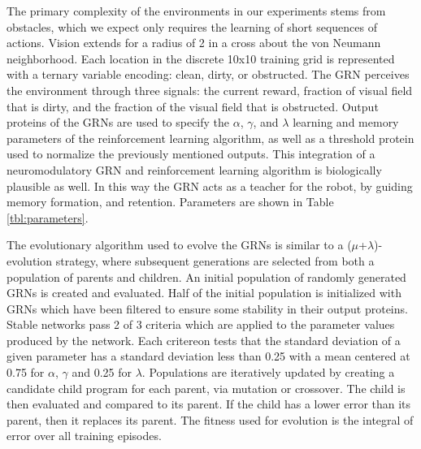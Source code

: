 \documentclass[conference]{IEEEtran}
\begin{document}
The primary complexity of the environments in our experiments stems from
obstacles, which we expect only requires the learning of short sequences of
actions. Vision extends for a radius of 2 in a cross about the von Neumann
neighborhood. Each location in the discrete 10x10 training grid is represented
with a ternary variable encoding: clean, dirty, or obstructed. The GRN perceives
the environment through three signals: the current reward, fraction of visual field
that is dirty, and the fraction of the visual field that is obstructed. Output
proteins of the GRNs are used to specify the $\alpha$, $\gamma$, and $\lambda$
learning and memory parameters of the reinforcement learning algorithm, as well as
a threshold protein used to normalize the previously mentioned outputs. This
integration of a neuromodulatory GRN and reinforcement learning algorithm is
biologically plausible as well. In this way the GRN acts as a teacher for the
robot, by guiding memory formation, and retention. Parameters are
shown in Table \ref{tbl:parameters}.

The evolutionary algorithm used to evolve the GRNs is similar to a
($\mu$+$\lambda$)-evolution strategy, where subsequent generations are selected
from both a population of parents and children. An initial population of
randomly generated GRNs is created and evaluated. Half of the initial population
is initialized with GRNs which have been filtered to ensure some stability in
their output proteins.
Stable networks pass 2 of 3 criteria which are applied to the parameter values
produced by the network. Each critereon tests that the standard deviation of a
given parameter has a standard deviation less than 0.25 with a mean centered at
0.75 for $\alpha$, $\gamma$ and 0.25 for $\lambda$.
Populations are iteratively updated by creating a candidate child program for
each parent, via mutation or crossover. The child is then evaluated and compared
to its parent. If the child has a lower error than its parent, then it replaces
its parent. The fitness used for evolution is the integral of error over all
training episodes.
\end{document}
